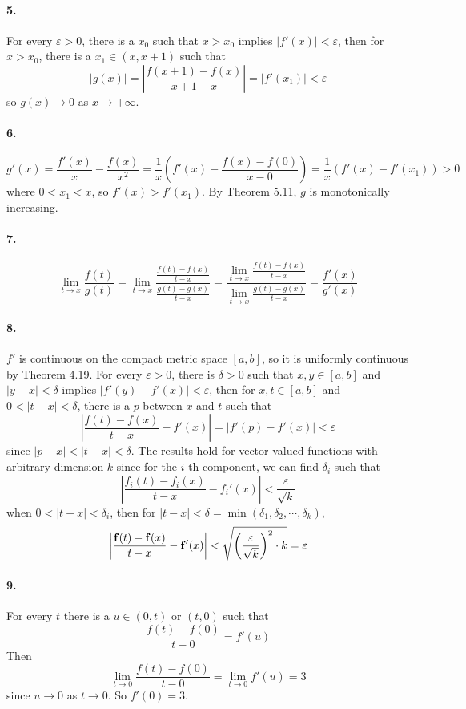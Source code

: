 \documentclass[a4paper]{article}
\begin{document}
\paragraph{5.}
For every $\varepsilon>0$, there is a $x_0$ such that $x>x_0$ implies $|f'(x)|<\varepsilon$, then for $x>x_0$, there is a $x_1\in(x,x+1)$ such that
\[
|g(x)|=\left|\frac{f(x+1)-f(x)}{x+1-x} \right|=|f'(x_1)|<\varepsilon
\]
so $g(x)\to0$ as $x\to+\infty$.

\paragraph{6.}
\[
g'(x)=\frac{f'(x)}{x}-\frac{f(x)}{x^2}=\frac{1}{x}\left(f'(x)-\frac{f(x)-f(0)}{x-0} \right)=\frac{1}{x}\left(f'(x)-f'(x_1) \right)>0
\]
where $0<x_1<x$, so $f'(x)>f'(x_1)$. By Theorem 5.11,\; $g$ is monotonically increasing.

\paragraph{7.}
\[
\lim_{t\to x}\frac{f(t)}{g(t)}=\lim_{t\to x}\frac{\frac{f(t)-f(x)}{t-x}}{\frac{g(t)-g(x)}{t-x}}=\frac{\lim_{t\to x}\frac{f(t)-f(x)}{t-x}}{\lim_{t\to x}\frac{g(t)-g(x)}{t-x}}=\frac{f'(x)}{g'(x)}
\]

\paragraph{8.}
$f'$ is continuous on the compact metric space $[a,b]$, so it is uniformly continuous by Theorem 4.19. For every $\varepsilon>0$, there is $\delta>0$ such that $x,y\in[a,b]$ and $|y-x|<\delta$ implies $|f'(y)-f'(x)|<\varepsilon$, then for $x,t\in[a,b]$ and $0<|t-x|<\delta$, there is a $p$ between $x$ and $t$ such that
\[
\left|\frac{f(t)-f(x)}{t-x}-f'(x) \right|=\left|f'(p)-f'(x) \right|<\varepsilon
\]
since $|p-x|<|t-x|<\delta$. The results hold for vector-valued functions with arbitrary dimension $k$ since for the $i$-th component, we can find $\delta_i$ such that
\[
\left|\frac{f_i(t)-f_i(x)}{t-x}-f_i'(x) \right|<\frac{\varepsilon}{\sqrt{k}}
\]
when $0<|t-x|<\delta_i$, then for $|t-x|<\delta=\min(\delta_1,\delta_2,\cdots,\delta_k)$, 
\[
\left|\frac{\mathbf{f}(t)-\mathbf{f}(x)}{t-x}-\mathbf{f}'(x) \right|<\sqrt{\left(\frac{\varepsilon}{\sqrt{k}} \right)^2\cdot k}=\varepsilon
\]

\paragraph{9.}
For every $t$ there is a $u\in(0,t)$ or $(t,0)$ such that
\[
\frac{f(t)-f(0)}{t-0}=f'(u)
\]
Then
\[
\lim_{t\to0}\frac{f(t)-f(0)}{t-0}=\lim_{t\to0}f'(u)=3
\]
since $u\to0$ as $t\to0$. So $f'(0)=3$.
\end{document}

